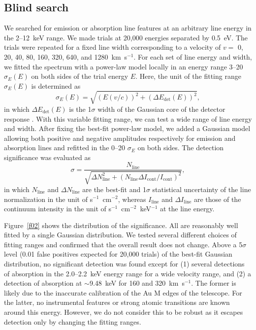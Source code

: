 \documentclass[]{pasj01}
\begin{document}
\subsection{Blind search}\label{s3-2}
We searched for emission or absorption line features at an arbitrary line energy in the
2--12~keV range. We made trials at 20,000 energies separated by 0.5~eV. The trials were
repeated for a fixed line width corresponding to a velocity of $v=$ 0, 20, 40, 80, 160,
320, 640, and 1280~km~s$^{-1}$. For each set of line energy and width, we fitted the
spectrum with a power-law model locally in an energy range 3--20 $\sigma_{E}(E)$ on both
sides of the trial energy $E$. Here, the unit of the fitting range $\sigma_{E}(E)$ is
determined as
\begin{equation}
 \sigma_E (E)= \sqrt{ (E (v/c))^{2} + (\Delta E_{\mathrm{det}}(E))^{2} },
\end{equation}
in which $\Delta E_{\mathrm{det}}(E)$ is the 1$\sigma$ width of the Gaussian core of the
detector response \citep{leutenegger16}. With this variable fitting range, we can test a
wide range of line energy and width. After fixing the best-fit power-law model, we added
a Gaussian model allowing both positive and negative amplitudes respectively for
emission and absorption lines and refitted in the 0--20 $\sigma_{E}$ on both sides. The
detection significance was evaluated as
\begin{equation}
 \sigma = \frac{N_{\mathrm{line}}}{\sqrt{\Delta {N_{\mathrm{line}}^2} +
  (N_{\mathrm{line}} \Delta I_{\mathrm{cont}}/I_{\mathrm{cont}})^2}}\label{e01},
\end{equation}
in which $N_{\mathrm{line}}$ and $\Delta N_{\mathrm{line}}$ are the best-fit and
1$\sigma$ statistical uncertainty of the line normalization in the unit of
s$^{-1}$~cm$^{-2}$, whereas $I_{\mathrm{line}}$ and $\Delta I_{\mathrm{line}}$ are those
of the continuum intensity in the unit of s$^{-1}$~cm$^{-2}$~keV$^{-1}$ at the line
energy.

Figure~\ref{f02} shows the distribution of the significance. All are reasonably well
fitted by a single Gaussian distribution. We tested several different choices of fitting
ranges and confirmed that the overall result does not change. Above a 5$\sigma$ level
(0.01 false positives expected for 20,000 trials) of the best-fit Gaussian distribution,
no significant detection was found except for (1) several detections of absorption in the
2.0--2.2~keV energy range for a wide velocity range, and (2) a detection of absorption
at $\sim$9.48~keV for 160 and 320~km~s$^{-1}$. The former is likely due to the
inaccurate calibration of the Au M edges of the telescope. For the latter, no instrumental
features or strong atomic transitions are known around this energy. However, we do not
consider this to be robust as it escapes detection only by changing the fitting ranges.
\end{document}
